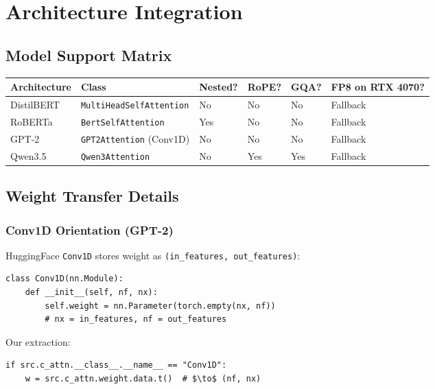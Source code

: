 
\section{Architecture Integration}

\subsection{Model Support Matrix}

\begin{table}[H]
\centering
\small
\begin{tabular}{llllll}
\toprule
\textbf{Architecture} & \textbf{Class} & \textbf{Nested?} & \textbf{RoPE?} & \textbf{GQA?} & \textbf{FP8 on RTX 4070?} \\
\midrule
DistilBERT & \texttt{MultiHeadSelfAttention} & No & No & No & Fallback \\
RoBERTa & \texttt{BertSelfAttention} & Yes & No & No & Fallback \\
GPT-2 & \texttt{GPT2Attention} (Conv1D) & No & No & No & Fallback \\
Qwen3.5 & \texttt{Qwen3Attention} & No & Yes & Yes & Fallback \\
\bottomrule
\end{tabular}
\end{table}

\subsection{Weight Transfer Details}

\subsubsection{Conv1D Orientation (GPT-2)}

HuggingFace \texttt{Conv1D} stores weight as \texttt{(in\_features, out\_features)}:

\begin{lstlisting}
class Conv1D(nn.Module):
    def __init__(self, nf, nx):
        self.weight = nn.Parameter(torch.empty(nx, nf))
        # nx = in_features, nf = out_features
\end{lstlisting}

Our extraction:

\begin{lstlisting}
if src.c_attn.__class__.__name__ == "Conv1D":
    w = src.c_attn.weight.data.t()  # $\to$ (nf, nx)
\end{lstlisting}

